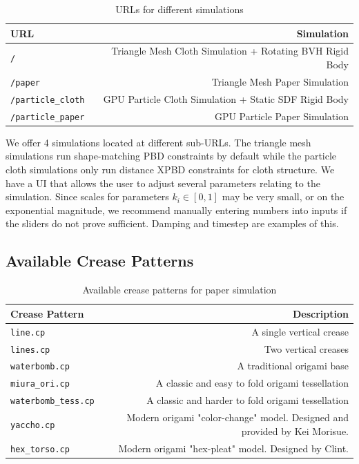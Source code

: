 \documentclass{article}
\begin{document}
\begin{table}[H]
\centering
\begin{tabular}{l|r}
URL & Simulation \\\hline
\verb|/| & Triangle Mesh Cloth Simulation + Rotating BVH Rigid Body \\
\verb|/paper| & Triangle Mesh Paper Simulation \\
\verb|/particle_cloth| & GPU Particle Cloth Simulation + Static SDF Rigid Body \\
\verb|/particle_paper| & GPU Particle Paper Simulation
\end{tabular}
\caption{\label{tab:widgets}URLs for different simulations}
\end{table}
We offer 4 simulations located at different sub-URLs. The triangle mesh simulations run shape-matching PBD constraints by default while the particle cloth simulations only run distance XPBD constraints for cloth structure. We have a UI that allows the user to adjust several parameters relating to the simulation. Since scales for parameters $k_i \in [0, 1]$ may be very small, or on the exponential magnitude, we recommend manually entering numbers into inputs if the sliders do not prove sufficient. Damping and timestep are examples of this. 

\subsection{Available Crease Patterns}

\begin{table}[H]
\centering
\begin{tabular}{l|r}
Crease Pattern & Description \\\hline
\verb|line.cp| & A single vertical crease \\
\verb|lines.cp| & Two vertical creases \\
\verb|waterbomb.cp| & A traditional origami base \\
\verb|miura_ori.cp| & A classic and easy to fold origami tessellation \\
\verb|waterbomb_tess.cp| & A classic and harder to fold origami tessellation \\
\verb|yaccho.cp| & Modern origami "color-change" model. Designed and provided by Kei Morisue. \\
\verb|hex_torso.cp| & Modern origami "hex-pleat" model. Designed by Clint.
\end{tabular}
\caption{\label{tab:widgets} Available crease patterns for paper simulation}
\end{table}
\end{document}
